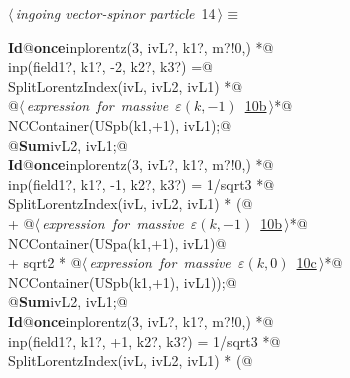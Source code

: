 \documentclass[a4paper,12pt]{amsart}
\renewcommand{\NWtarget}[2]{\hypertarget{#1}{#2}}
\renewcommand{\NWlink}[2]{\hyperlink{#1}{#2}}
\begin{document}
\begin{flushleft} \small
\begin{minipage}{\linewidth}\label{scrap33}\raggedright\small
\NWtarget{nuweb14}{} $\langle\,${\itshape ingoing vector-spinor particle}\nobreak\ {\footnotesize {14}}$\,\rangle\equiv$
\vspace{-1ex}
\begin{list}{}{} \item
\mbox{}\verb@@\hbox{\sffamily\bfseries Id}\verb@ @\hbox{\sffamily\bfseries once}\verb@ inplorentz(3, ivL?, k1?, m?!{0,}) *@\\
\mbox{}\verb@      inp(field1?, k1?, -2, k2?, k3?) =@\\
\mbox{}\verb@   SplitLorentzIndex(ivL, ivL2, ivL1) *@\\
\mbox{}\verb@   @\hbox{$\langle\,${\itshape expression for massive $\varepsilon(k, -1)$}\nobreak\ {\footnotesize \NWlink{nuweb10b}{10b}}$\,\rangle$}\verb@ *@\\
\mbox{}\verb@   NCContainer(USpb(k1,+1), ivL1);@\\
\mbox{}\verb@   @\hbox{\sffamily\bfseries Sum}\verb@ ivL2, ivL1;@\\
\mbox{}\verb@@\hbox{\sffamily\bfseries Id}\verb@ @\hbox{\sffamily\bfseries once}\verb@ inplorentz(3, ivL?, k1?, m?!{0,}) *@\\
\mbox{}\verb@      inp(field1?, k1?, -1, k2?, k3?) = 1/sqrt3 *@\\
\mbox{}\verb@   SplitLorentzIndex(ivL, ivL2, ivL1) * (@\\
\mbox{}\verb@   + @\hbox{$\langle\,${\itshape expression for massive $\varepsilon(k, -1)$}\nobreak\ {\footnotesize \NWlink{nuweb10b}{10b}}$\,\rangle$}\verb@ *@\\
\mbox{}\verb@     NCContainer(USpa(k1,+1), ivL1)@\\
\mbox{}\verb@   + sqrt2 * @\hbox{$\langle\,${\itshape expression for massive $\varepsilon(k, 0)$}\nobreak\ {\footnotesize \NWlink{nuweb10c}{10c}}$\,\rangle$}\verb@ *@\\
\mbox{}\verb@     NCContainer(USpb(k1,+1), ivL1));@\\
\mbox{}\verb@   @\hbox{\sffamily\bfseries Sum}\verb@ ivL2, ivL1;@\\
\mbox{}\verb@@\hbox{\sffamily\bfseries Id}\verb@ @\hbox{\sffamily\bfseries once}\verb@ inplorentz(3, ivL?, k1?, m?!{0,}) *@\\
\mbox{}\verb@      inp(field1?, k1?, +1, k2?, k3?) = 1/sqrt3 *@\\
\mbox{}\verb@   SplitLorentzIndex(ivL, ivL2, ivL1) * (@\\

\end{list}
\end{minipage}
\end{flushleft}
\end{document}

